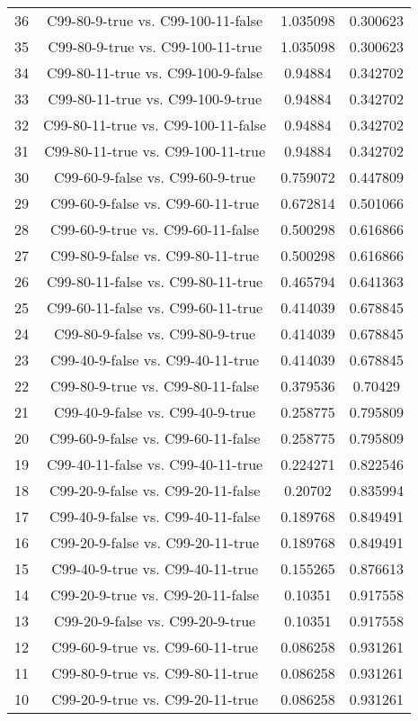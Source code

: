 \documentclass[a4paper,10pt]{article}
\begin{document}
\begin{landscape}
\begin{table}[!htp]
\begin{tabular}{cccc}
36&C99-80-9-true vs. C99-100-11-false&1.035098&0.300623\\
35&C99-80-9-true vs. C99-100-11-true&1.035098&0.300623\\
34&C99-80-11-true vs. C99-100-9-false&0.94884&0.342702\\
33&C99-80-11-true vs. C99-100-9-true&0.94884&0.342702\\
32&C99-80-11-true vs. C99-100-11-false&0.94884&0.342702\\
31&C99-80-11-true vs. C99-100-11-true&0.94884&0.342702\\
30&C99-60-9-false vs. C99-60-9-true&0.759072&0.447809\\
29&C99-60-9-false vs. C99-60-11-true&0.672814&0.501066\\
28&C99-60-9-true vs. C99-60-11-false&0.500298&0.616866\\
27&C99-80-9-false vs. C99-80-11-true&0.500298&0.616866\\
26&C99-80-11-false vs. C99-80-11-true&0.465794&0.641363\\
25&C99-60-11-false vs. C99-60-11-true&0.414039&0.678845\\
24&C99-80-9-false vs. C99-80-9-true&0.414039&0.678845\\
23&C99-40-9-false vs. C99-40-11-true&0.414039&0.678845\\
22&C99-80-9-true vs. C99-80-11-false&0.379536&0.70429\\
21&C99-40-9-false vs. C99-40-9-true&0.258775&0.795809\\
20&C99-60-9-false vs. C99-60-11-false&0.258775&0.795809\\
19&C99-40-11-false vs. C99-40-11-true&0.224271&0.822546\\
18&C99-20-9-false vs. C99-20-11-false&0.20702&0.835994\\
17&C99-40-9-false vs. C99-40-11-false&0.189768&0.849491\\
16&C99-20-9-false vs. C99-20-11-true&0.189768&0.849491\\
15&C99-40-9-true vs. C99-40-11-true&0.155265&0.876613\\
14&C99-20-9-true vs. C99-20-11-false&0.10351&0.917558\\
13&C99-20-9-false vs. C99-20-9-true&0.10351&0.917558\\
12&C99-60-9-true vs. C99-60-11-true&0.086258&0.931261\\
11&C99-80-9-true vs. C99-80-11-true&0.086258&0.931261\\
10&C99-20-9-true vs. C99-20-11-true&0.086258&0.931261\\

\end{tabular}
\end{table}
\end{landscape}
\end{document}
